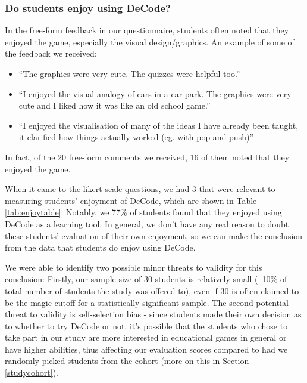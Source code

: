 \documentclass[11pt]{article}
\begin{document}
\subsubsection{Do students enjoy using DeCode?}
In the free-form feedback in our questionnaire, students often noted that they enjoyed the game, especially the visual design/graphics. An example of some of the feedback we received;
\begin{spacing}{1.5}
\begin{itemize}
  \item ``The graphics were very cute. The quizzes were helpful too.''
  \item ``I enjoyed the visual analogy of cars in a car park. The graphics were very cute and I liked how it was like an old school game.''
  \item ``I enjoyed the visualisation of many of the ideas I have already been taught, it clarified how things actually worked (eg. with pop and push)''
\end{itemize}
\end{spacing}
In fact, of the 20 free-form comments we received, 16 of them noted that they enjoyed the game.\par
When it came to the likert scale questions, we had 3 that were relevant to measuring students' enjoyment of DeCode, which are shown in Table \ref{tab:enjoytable}. Notably, we 77\% of students found that they enjoyed using DeCode as a learning tool. In general, we don't have any real reason to doubt these students' evaluation of their own enjoyment, so we can make the conclusion from the data that students do enjoy using DeCode.\par
We were able to identify two possible minor threats to validity for this conclusion: Firstly, our sample size of 30 students is relatively small (~10\% of total number of students the study was offered to), even if 30 is often claimed to be the magic cutoff for a statistically significant sample. The second potential threat to validity is self-selection bias - since students made their own decision as to whether to try DeCode or not, it's possible that the students who chose to take part in our study are more interested in educational games in general or have higher abilities, thus affecting our evaluation scores compared to had we randomly picked students from the cohort (more on this in Section \ref{studycohort}).
\end{document}
